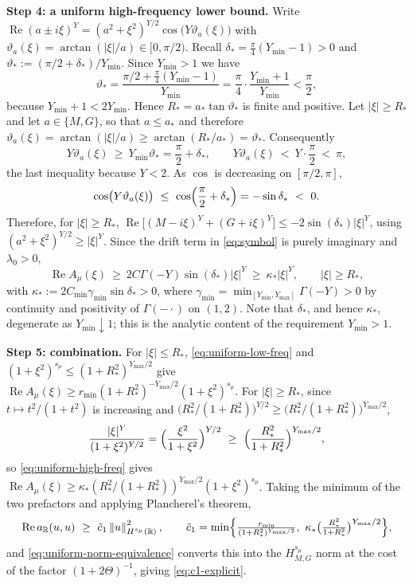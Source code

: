 \documentclass[11pt]{amsart}
\theoremstyle{remark}
\newcommand{\R}{\mathbb{R}}
\newcommand{\norm}[1]{\left\lVert #1\right\rVert}
\DeclareMathOperator{\Real}{Re}
\begin{document}
\medskip\noindent
\textbf{Step 4: a uniform high-frequency lower bound.}
Write $\Real(a\pm i\xi)^Y=(a^2+\xi^2)^{Y/2}\cos\bigl(Y\vartheta_a(\xi)\bigr)$
with $\vartheta_a(\xi)=\arctan(|\xi|/a)\in[0,\pi/2)$.  Recall
$\delta_\ast=\tfrac\pi4(Y_{\min}-1)>0$ and
$\vartheta_\ast:=(\pi/2+\delta_\ast)/Y_{\min}$.  Since
$Y_{\min}>1$ we have
\[
  \vartheta_\ast
  =\frac{\pi/2+\tfrac\pi4(Y_{\min}-1)}{Y_{\min}}
  =\frac{\pi}{4}\cdot\frac{Y_{\min}+1}{Y_{\min}}
  <\frac{\pi}{2},
\]
because $Y_{\min}+1<2Y_{\min}$.  Hence $R_\ast=a_\ast\tan\vartheta_\ast$ is
finite and positive.  Let $|\xi|\ge R_\ast$ and let $a\in\{M,G\}$, so that
$a\le a_\ast$ and therefore
$\vartheta_a(\xi)=\arctan(|\xi|/a)\ge\arctan(R_\ast/a_\ast)=\vartheta_\ast$.
Consequently
\[
  Y\vartheta_a(\xi)\ \ge\ Y_{\min}\vartheta_\ast=\frac\pi2+\delta_\ast,
  \qquad
  Y\vartheta_a(\xi)\ <\ Y\cdot\frac\pi2\ <\ \pi ,
\]
the last inequality because $Y<2$.  As $\cos$ is decreasing on
$[\pi/2,\pi]$,
\[
  \cos\bigl(Y\vartheta_a(\xi)\bigr)\ \le\ \cos\Bigl(\frac\pi2+\delta_\ast\Bigr)
  =-\sin\delta_\ast\ <\ 0 .
\]
Therefore, for $|\xi|\ge R_\ast$,
$\Real\bigl[(M-i\xi)^Y+(G+i\xi)^Y\bigr]\le-2\sin(\delta_\ast)|\xi|^Y$, using
$(a^2+\xi^2)^{Y/2}\ge|\xi|^Y$.  Since the drift term in \eqref{eq:symbol} is
purely imaginary and $\lambda_0>0$,
\begin{equation}
  \Real A_\mu(\xi)
  \ \ge\ 2C\Gamma(-Y)\sin(\delta_\ast)|\xi|^Y
  \ \ge\ \kappa_\ast|\xi|^{Y},
  \qquad |\xi|\ge R_\ast,
  \label{eq:uniform-high-freq}
\end{equation}
with $\kappa_\ast:=2C_{\min}\gamma_{\min}\sin\delta_\ast>0$, where
$\gamma_{\min}=\min_{[Y_{\min},Y_{\max}]}\Gamma(-Y)>0$ by continuity and
positivity of $\Gamma(-\cdot)$ on $(1,2)$.  Note that $\delta_\ast$, and hence
$\kappa_\ast$, degenerate as $Y_{\min}\downarrow1$; this is the analytic
content of the requirement $Y_{\min}>1$.

\medskip\noindent
\textbf{Step 5: combination.}
For $|\xi|\le R_\ast$, \eqref{eq:uniform-low-freq} and
$(1+\xi^2)^{s_\mu}\le(1+R_\ast^2)^{Y_{\max}/2}$ give
$\Real A_\mu(\xi)\ge r_{\min}(1+R_\ast^2)^{-Y_{\max}/2}(1+\xi^2)^{s_\mu}$.
For $|\xi|\ge R_\ast$, since $t\mapsto t^2/(1+t^2)$ is increasing and
$\bigl(R_\ast^2/(1+R_\ast^2)\bigr)^{Y/2}
\ge\bigl(R_\ast^2/(1+R_\ast^2)\bigr)^{Y_{\max}/2}$,
\[
  \frac{|\xi|^{Y}}{(1+\xi^2)^{Y/2}}
  =\Bigl(\frac{\xi^2}{1+\xi^2}\Bigr)^{Y/2}
  \ \ge\ \Bigl(\frac{R_\ast^2}{1+R_\ast^2}\Bigr)^{Y_{\max}/2},
\]
so \eqref{eq:uniform-high-freq} gives
$\Real A_\mu(\xi)\ge\kappa_\ast(R_\ast^2/(1+R_\ast^2))^{Y_{\max}/2}(1+\xi^2)^{s_\mu}$.
Taking the minimum of the two prefactors and applying Plancherel's theorem,
\[
  \Real a_\R(u,u)\ \ge\ \tilde c_1\norm{u}_{H^{s_\mu}(\R)}^2,
  \qquad
  \tilde c_1
  =\min\Bigl\{\tfrac{r_{\min}}{(1+R_\ast^2)^{Y_{\max}/2}},\
   \kappa_\ast\bigl(\tfrac{R_\ast^2}{1+R_\ast^2}\bigr)^{Y_{\max}/2}\Bigr\},
\]
and \eqref{eq:uniform-norm-equivalence} converts this into the
$H^{s_\mu}_{M,G}$ norm at the cost of the factor $(1+2\Theta)^{-1}$, giving
\eqref{eq:c1-explicit}.
\end{document}
